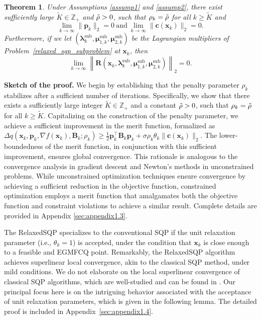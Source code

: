 \documentclass[aos]{imsart}
\numberwithin{equation}{section}
\theoremstyle{plain}
\newtheorem{theorem}{Theorem}
\begin{document}
\begin{theorem}
\label{theorem_det_sqp}
Under Assumptions \ref{assump1} and \ref{assump2}, there exist sufficiently large $\widetilde{K} \in \mathbb{Z}_{+}$ and $\Tilde{\rho}>0$, such that $\rho_k = \Tilde{\rho}$ for all $k \geq \widetilde{K}$ and 
\begin{equation}
\label{eq4}
    \lim_{k \to \infty} \|\bm{p}_k\|_2 = 0~\text{and}~ \lim_{k \to \infty} \|\bm{c}(\bm{x}_k)\|_2 = 0.
\end{equation}
Furthermore, if we let $(\bm{\lambda}_k^{\text{sub}}, \bm{\mu}_{1,k}^{\text{sub}},\bm{\mu}_{2,k}^{\text{sub}})$ be the Lagrangian multipliers of Problem~\eqref{relaxed_sqp_subproblem} at $\bm{x}_k$, then 
\begin{equation}
\label{eq5}
    \lim_{k \to \infty} \left\| \bm{R}(\bm{x}_k, \bm{\lambda}_k^{\text{sub}}, \bm{\mu}_{1,k}^{\text{sub}}, \bm{\mu}_{2,k}^{\text{sub}}) \right\|_2 = 0.
\end{equation}
\end{theorem}


\textbf{Sketch of the proof.} We begin by establishing that the penalty parameter $\rho_k$ stabilizes after a sufficient number of iterations. Specifically, we show that there exists a sufficiently large integer $\widetilde{K} \in \mathbb{Z}_{+}$ and a constant $\Tilde{\rho} > 0$, such that $\rho_k = \Tilde{\rho}$ for all $k \geq \widetilde{K}$.
Capitalizing on the construction of the penalty parameter, we achieve a sufficient improvement in the merit function, formalized as $\Delta q(\bm{x}_k,\bm{p}_k,\nabla f(\bm{x}_k),\bm{B}_k;\rho_k) \geq \frac{1}{2} \bm{p}_k^{\top} \bm{B}_k \bm{p}_k + \sigma \rho_k \theta_k \|\bm{c}(\bm{x}_k)\|_2$. The lower-boundedness of the merit function, in conjunction with this sufficient improvement, ensures global convergence. This rationale is analogous to the convergence analysis in gradient descent and Newton's methods in unconstrained problems. 
While unconstrained optimization techniques ensure convergence by achieving a sufficient reduction in the objective function, constrained optimization employs a merit function that amalgamates both the objective function and constraint violations to achieve a similar result. Complete details are provided in Appendix \ref{sec:appendix1.3}.


The RelaxedSQP specializes to the conventional SQP if the unit relaxation parameter (i.e., $\theta_k =1$) is accepted, under the condition that $\bm{x}_k$ is close enough to a feasible and EGMFCQ point. Remarkably, the RelaxedSQP algorithm achieves superlinear local convergence, akin to the classical SQP method, under mild conditions. 
We do not elaborate on the local superlinear convergence of classical SQP algorithms, which are well-studied and can be found in \cite{jorge2006numerical, ulbrich2004superlinear, boggs1995sequential, liu2011sequential, schittkowski2010sequential}. 
Our principal focus here is on the intriguing behavior associated with the acceptance of unit relaxation parameters, which is given in the following lemma. 
The detailed proof is included in Appendix~\ref{sec:appendix1.4}.
\end{document}
